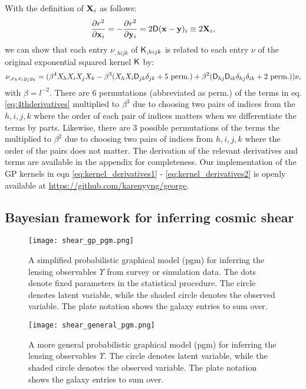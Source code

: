 With the definition of ${\bf X}_i$ as follows:
\begin{equation}
	\frac{\partial r^2}{\partial \mathbf{x}_i} = -\frac{\partial
	r^2}{\partial \mathbf{y}_i} =
	2 \mathsf{D}(\mathbf{x} - \mathbf{y})_i \equiv 2{\bf X}_i,
\end{equation}
we can show that each entry $\nu_{,hijk}$ of $\mathsf{K}_{,hijk}$ is
related to each entry $\nu$ of the original exponential squared kernel
$\mathsf{K}$ by:
\begin{equation}
\nu_{,x_h x_i y_j y_k} = (\beta^4 X_h X_i X_j X_k -
\beta^3 (X_h X_i \mathsf{D}_{jk} \delta_{jk} + 5~{\rm perm.}) + \beta^2
(\mathsf{D}_{hj} \mathsf{D}_{ik}\delta_{hj}\delta_{ik} + 2~{\rm perm.})) \nu,
\label{eq:4thderivatives}
\end{equation}
with $\beta = l^{-2}$. There are 6 permutations (abbreviated as perm.) of the terms in
eq. \ref{eq:4thderivatives}
multiplied to $\beta^3$ due
to choosing two pairs of indices from the $h,i,j,k$ where the order of each
pair of indices matters when we differentiate the terms by parts. 
Likewise, there are 3 possible permutations of
the terms the multiplied to $\beta^2$ due to choosing two pairs of indices from
$h, i, j, k$ where the order of the pairs does not matter.
The derivation of the relevant derivatives and terms are available 
in the appendix for completeness. 
Our implementation of the GP kernels in eqn \ref{eq:kernel_derivatives1} - 
\ref{eq:kernel_derivatives2} is openly available at
\href{https://github.com/karenyyng/george}{https://github.com/karenyyng/george}.


\subsection{Bayesian framework for inferring cosmic shear}
\begin{figure}
	\centering
	\texttt{[image: shear\_gp\_pgm.png]}
	\caption{A simplified probabilistic graphical model (pgm) for inferring
		the lensing observables $\Upsilon$ from survey or simulation data. The dots
		denote fixed parameters in the statistical procedure. The circle denotes
		latent variable, while the shaded circle denotes 
		the observed variable. The plate notation shows the galaxy entries to sum
		over.
		\label{fig:simplified_pgm}}
\end{figure}

\begin{figure}
	\centering
	\texttt{[image: shear\_general\_pgm.png]}
	\caption{A more general probabilistic graphical model (pgm) for inferring
		the lensing observables $\Upsilon$. The circle denotes
		latent variable, while the shaded circle denotes 
		the observed variable. The plate notation shows the galaxy entries to sum
		over.
		\label{fig:general_pgm}}
\end{figure}

